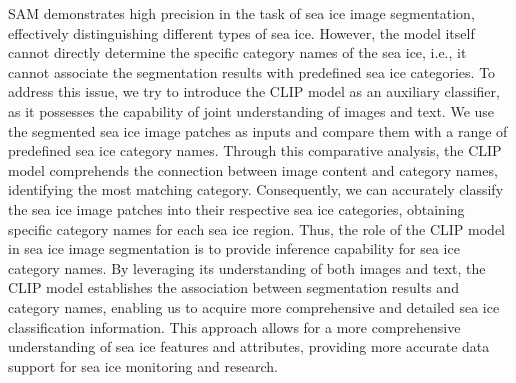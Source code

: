




SAM demonstrates high precision in the task of sea ice image segmentation, effectively distinguishing different types of sea ice. However, the model itself cannot directly determine the specific category names of the sea ice, i.e., it cannot associate the segmentation results with predefined sea ice categories. To address this issue, we try to introduce the CLIP model \cite{153radford2021learning} as an auxiliary classifier, as it possesses the capability of joint understanding of images and text. We use the segmented sea ice image patches as inputs and compare them with a range of predefined sea ice category names. Through this comparative analysis, the CLIP model comprehends the connection between image content and category names, identifying the most matching category. Consequently, we can accurately classify the sea ice image patches into their respective sea ice categories, obtaining specific category names for each sea ice region. Thus, the role of the CLIP model in sea ice image segmentation is to provide inference capability for sea ice category names. By leveraging its understanding of both images and text, the CLIP model establishes the association between segmentation results and category names, enabling us to acquire more comprehensive and detailed sea ice classification information. This approach allows for a more comprehensive understanding of sea ice features and attributes, providing more accurate data support for sea ice monitoring and research.

